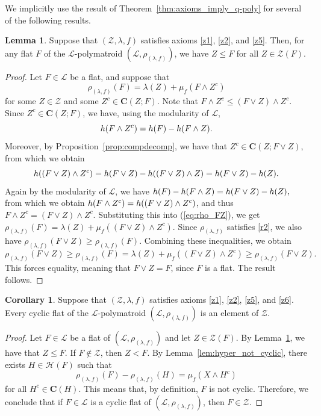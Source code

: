 \documentclass[a4paper,11pt,reqno]{article}
\theoremstyle{definition}
\newtheorem{corollary}[theorem]{{{Corollary}}}
\newtheorem{lemma}[theorem]{{{Lemma}}}
\newcommand{\mZ}{\mathcal{Z}}
\begin{document}
We implicitly use the result of Theorem~\ref{thm:axioms_imply_q-poly} for several of the following results.

\begin{lemma}\label{lem:Z_leq_flat}
    Suppose that $(\mZ,\lambda,f)$ satisfies axioms \ref{z1}, \ref{z2}, and \ref{z5}. Then, for any flat $F$ of the $\mathcal{L}$-polymatroid $(\mathcal{L},\rho_{(\lambda,f)})$, we have $Z \leq F$ for all $Z \in \mathcal{Z}(F)$.
\end{lemma}

\begin{proof}
    Let $F \in \mathcal{L}$ be a flat, and suppose that
    \begin{equation}\label{eq:rho_FZ}
        \rho_{(\lambda,f)}(F) = \lambda(Z) + \mu_f(F \wedge Z^c)
    \end{equation}
    for some $Z \in \mathcal{Z}$ and some $Z^c \in \textbf{C}(Z;F)$. Note that $F \wedge Z^c \leq (F \vee Z) \wedge Z^c$. Since $Z^c\in\mathbf{C}(Z;F)$, we have, using the modularity of $\mathcal{L}$,
    $$\textup{h}(F\wedge Z^c)=\textup{h}(F)-\textup{h}(F\wedge Z).$$
    Moreover, by Proposition~\ref{prop:compdecomp}, we have that $Z^c\in\mathbf{C}(Z;F\vee Z)$, from which we obtain
    $$\textup{h}((F\vee Z)\wedge Z^c)=\textup{h}(F\vee Z)-\textup{h}((F\vee Z)\wedge Z)=\textup{h}(F\vee Z)-\textup{h}(Z).$$
    Again by the modularity of $\mathcal{L}$, we have
    $\textup{h}(F)-\textup{h}(F\wedge Z)=\textup{h}(F\vee Z)-\textup{h}(Z),$
    from which we obtain $\textup{h}(F\wedge Z^c)=\textup{h}((F\vee Z)\wedge Z^c)$, and thus 
    $F \wedge Z^c = (F \vee Z) \wedge Z^c.$
    Substituting this into (\ref{eq:rho_FZ}), we get $\rho_{(\lambda,f)}(F) = \lambda(Z) + \mu_f((F \vee Z) \wedge Z^c).$
    Since $\rho_{(\lambda,f)}$ satisfies \ref{r2}, we also have $\rho_{(\lambda,f)}(F \vee Z) \geq \rho_{(\lambda,f)}(F).$
    Combining these inequalities, we obtain
    \[
    \rho_{(\lambda,f)}(F \vee Z) \geq \rho_{(\lambda,f)}(F) = \lambda(Z) + \mu_f((F \vee Z) \wedge Z^c) \geq \rho_{(\lambda,f)}(F \vee Z).
    \]
    This forces equality, meaning that $F \vee Z = F$, since $F$ is a flat. The result follows.
\end{proof}

\begin{corollary}\label{lem:cyc_flats_in_Z}
    Suppose that $(\mZ,\lambda,f)$ satisfies axioms \ref{z1}, \ref{z2}, \ref{z5}, and \ref{z6}. Every cyclic flat of the $\mathcal{L}$-polymatroid $(\mathcal{L},\rho_{(\lambda,f)})$ is an element of $\mathcal{Z}$.
\end{corollary}
\begin{proof}
    Let $F\in\mathcal{L}$ be a flat of $(\mathcal{L},\rho_{(\lambda,f)})$ and let $Z\in\mathcal{Z}(F)$. By Lemma~\ref{lem:Z_leq_flat}, we have that $Z \leq F$. If $F \notin \mathcal{Z}$, then $Z < F$. By Lemma~\ref{lem:hyper_not_cyclic}, there exists $H\in\mathcal{H}(F)$ such that
    $$\rho_{(\lambda,f)}(F)-\rho_{(\lambda,f)}(H)=\mu_f(X\wedge H^c)$$
    for all $H^c\in\mathbf{C}(H)$. This means that, by definition, $F$ is not cyclic. Therefore, we conclude that if $F\in\mathcal{L}$ is a cyclic flat of $(\mathcal{L},\rho_{(\lambda,f)})$, then $F\in\mathcal{Z}$.
\end{proof}
\end{document}
